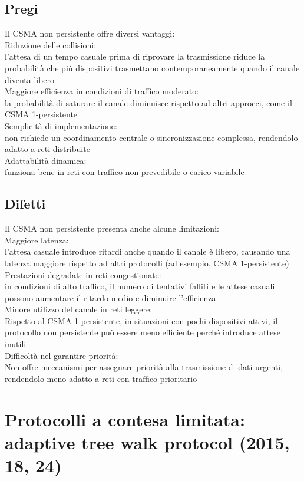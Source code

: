 \documentclass[10pt,oneside,a4paper]{article}
\begin{document}
\subsection{Pregi}
Il CSMA non persistente offre diversi vantaggi:\\
Riduzione delle collisioni:\\
l’attesa di un tempo casuale prima di riprovare la trasmissione riduce la probabilità che più dispositivi trasmettano contemporaneamente quando il canale diventa libero\\
Maggiore efficienza in condizioni di traffico moderato:\\
la probabilità di saturare il canale diminuisce rispetto ad altri approcci, come il CSMA 1-persistente\\
Semplicità di implementazione:\\
non richiede un coordinamento centrale o sincronizzazione complessa, rendendolo adatto a reti distribuite\\
Adattabilità dinamica:\\
funziona bene in reti con traffico non prevedibile o carico variabile
\subsection{Difetti}
Il CSMA non persistente presenta anche alcune limitazioni:\\
Maggiore latenza:\\
l’attesa casuale introduce ritardi anche quando il canale è libero, causando una latenza maggiore rispetto ad altri protocolli (ad esempio, CSMA 1-persistente)\\
Prestazioni degradate in reti congestionate:\\
in condizioni di alto traffico, il numero di tentativi falliti e le attese casuali possono aumentare il ritardo medio e diminuire l'efficienza\\
Minore utilizzo del canale in reti leggere:\\
Rispetto al CSMA 1-persistente, in situazioni con pochi dispositivi attivi, il protocollo non persistente può essere meno efficiente perché introduce attese inutili\\
Difficoltà nel garantire priorità:\\
Non offre meccanismi per assegnare priorità alla trasmissione di dati urgenti, rendendolo meno adatto a reti con traffico prioritario
\section{Protocolli a contesa limitata: adaptive tree walk protocol (2015, 18, 24)}
\end{document}

